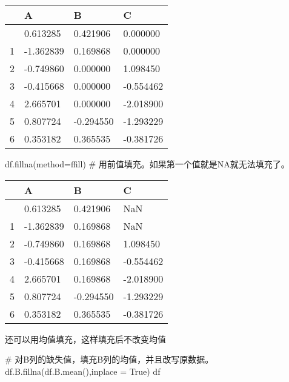\documentclass[
  letterpaper,
  DIV=11,
  numbers=noendperiod]{scrreprt}
\newenvironment{Shaded}{\begin{snugshade}}{\end{snugshade}}
\newcommand{\CommentTok}[1]{\textcolor[rgb]{0.37,0.37,0.37}{#1}}
\newcommand{\NormalTok}[1]{\textcolor[rgb]{0.00,0.23,0.31}{#1}}
\newcommand{\OperatorTok}[1]{\textcolor[rgb]{0.37,0.37,0.37}{#1}}
\newcommand{\StringTok}[1]{\textcolor[rgb]{0.13,0.47,0.30}{#1}}
\newcommand{\VariableTok}[1]{\textcolor[rgb]{0.07,0.07,0.07}{#1}}
\begin{document}
\begin{longtable}[]{@{}llll@{}}
\toprule\noalign{}
& A & B & C \\
\midrule\noalign{}
\endhead
\bottomrule\noalign{}
\endlastfoot
0 & 0.613285 & 0.421906 & 0.000000 \\
1 & -1.362839 & 0.169868 & 0.000000 \\
2 & -0.749860 & 0.000000 & 1.098450 \\
3 & -0.415668 & 0.000000 & -0.554462 \\
4 & 2.665701 & 0.000000 & -2.018900 \\
5 & 0.807724 & -0.294550 & -1.293229 \\
6 & 0.353182 & 0.365535 & -0.381726 \\
\end{longtable}

\begin{Shaded}
\begin{Highlighting}[]
\NormalTok{df.fillna(method}\OperatorTok{=}\StringTok{\textquotesingle{}ffill\textquotesingle{}}\NormalTok{) }\CommentTok{\# 用前值填充。如果第一个值就是NA就无法填充了。}
\end{Highlighting}
\end{Shaded}

\begin{longtable}[]{@{}llll@{}}
\toprule\noalign{}
& A & B & C \\
\midrule\noalign{}
\endhead
\bottomrule\noalign{}
\endlastfoot
0 & 0.613285 & 0.421906 & NaN \\
1 & -1.362839 & 0.169868 & NaN \\
2 & -0.749860 & 0.169868 & 1.098450 \\
3 & -0.415668 & 0.169868 & -0.554462 \\
4 & 2.665701 & 0.169868 & -2.018900 \\
5 & 0.807724 & -0.294550 & -1.293229 \\
6 & 0.353182 & 0.365535 & -0.381726 \\
\end{longtable}

还可以用均值填充，这样填充后不改变均值

\begin{Shaded}
\begin{Highlighting}[]

\CommentTok{\# 对B列的缺失值，填充B列的均值，并且改写原数据。}
\NormalTok{df.B.fillna(df.B.mean(),inplace }\OperatorTok{=} \VariableTok{True}\NormalTok{)}
\NormalTok{df}
\end{Highlighting}
\end{Shaded}
\end{document}
